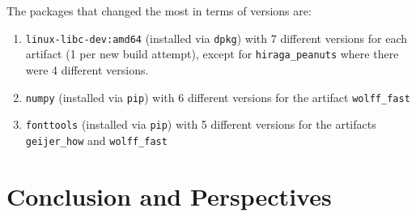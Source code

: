 \documentclass[sigconf,natbib=false]{acmart}
\begin{document}
The packages that changed the most in terms of versions are:
\begin{enumerate}
\item \texttt{linux-libc-dev:amd64} (installed via \texttt{dpkg}) with 7 different versions for each artifact (1 per new build attempt), except for \texttt{hiraga\_peanuts} where there were 4 different versions.
\item \texttt{numpy} (installed via \texttt{pip}) with 6 different versions for the artifact \texttt{wolff\_fast}
\item \texttt{fonttools} (installed via \texttt{pip}) with 5 different versions for the artifacts \texttt{geijer\_how} and \texttt{wolff\_fast}
\end{enumerate}


\section{Conclusion and Perspectives}\label{sec:conclusion}
\end{document}
